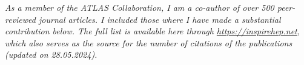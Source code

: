 

\textit{As a member of the ATLAS Collaboration, I am a co-author of over 500 peer-reviewed journal articles. I included those where I have made a substantial contribution below. The full list is available here through \href{https://inspirehep.net/}{https://inspirehep.net}, which also serves as the source for the number of citations of the publications (updated on 28.05.2024).}


